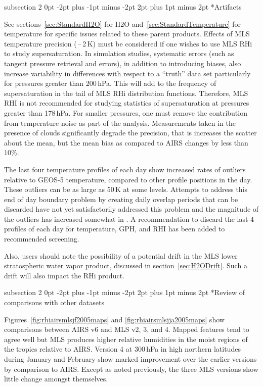 \documentclass[11pt,draft]{report}
\makeatletter
\renewcommand{\subsection}{\@startsection%
  {subsection}%
  {2}%
  {0pt}%
  {-2pt plus -1pt minus -2pt}%
  {2pt plus 1pt minus 2pt}%
  {\large\sffamily\fontseries{sb}\selectfont\flushleft\color{SectionColor}\figureversion{tabular}}}%
\makeatother
\begin{document}
\subsection*{Artifacts}

See sections~\ref{sec:StandardH2O} for H\cs2O
and~\ref{sec:StandardTemperature} for temperature for specific issues
related to these parent products. Effects of MLS temperature precision
(\,--\,2\,K) must be considered if one wishes to use MLS
RHi to study supersaturation. In simulation studies, systematic errors
(such as tangent pressure retrieval and errors), in addition to
introducing biases, also increase variability in differences with
respect to a ``truth'' data set particularly for pressures greater than
200\,hPa. This will add to the frequency of supersaturation in the tail
of MLS RHi distribution functions.  Therefore, MLS RHI is not
recommended for studying statistics of supersaturation at pressures
greater than 178\,hPa. For smaller pressures, one must remove the
contribution from temperature noise as part of the analysis.
Measurements taken in the presence of clouds significantly degrade the
precision, that is increases the scatter about the mean, but the mean
bias as compared to AIRS changes by less than 10\%.

The last four temperature profiles of each day show increased rates of
outliers relative to GEOS-5 temperature, compared to other profile
positions in the day.  These outliers can be as large as 50\,K at some
levels.  Attempts to address this end of day boundary problem by
creating daily overlap periods that can be discarded have not yet
satisfactorily addressed this problem and the magnitude of the outliers
has increased somewhat in \thisv.  A recommendation to discard the last
4 profiles of each day for temperature, GPH, and RHI has been added to
recommended screening.

Also, users should note the possibility of a potential drift in the MLS
lower stratospheric water vapor product, discussed in
section~\ref{sec:H2ODrift}.  Such a drift will also impact the RHi
product.

\subsection*{Review of comparisons with other datasets}

Figures~\ref{fig:rhiairsmlsjf2005maps} and
\ref{fig:rhiairsmlsjja2005maps} show comparisons between AIRS v6 and MLS
v2, 3, and 4. Mapped features tend to agree well but MLS produces higher
relative humidities in the moist regions of the tropics relative to
AIRS. Version 4 at 300\,hPa in high northern latitudes during January
and February show marked improvement over the earlier versions by
comparison to AIRS\@. Except as noted previously, the three MLS versions
show little change amongst themselves.
\end{document}
